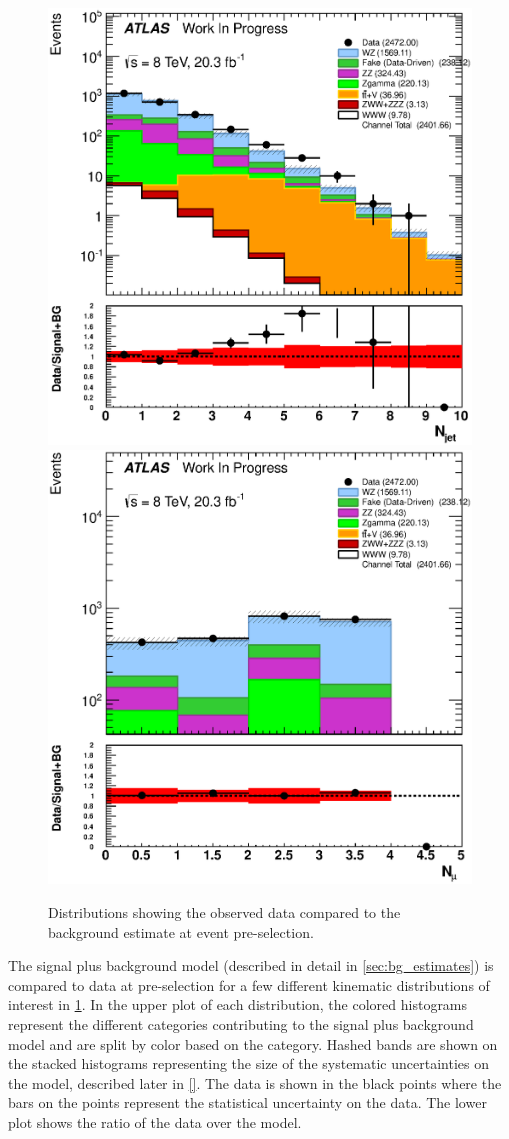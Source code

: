 \begin{figure}[ht!]
\includegraphics[width=0.3\columnwidth]{figures/appendix_signal_selection/Nov24Update_FakeSys_KFacSys_LogY_NoRebin/output/jobs/MxM/DataFull_Rates_May13_FakeRatesExactly2Loose_MuonMxMBJetGt0_ElBJetGt0SubtractPC_MxM/PreselectionNov23_15_physics/weight_all/eps/NJets_histratio.eps}
\includegraphics[width=0.3\columnwidth]{figures/appendix_signal_selection/Nov24Update_FakeSys_KFacSys_LogY_NoRebin/output/jobs/MxM/DataFull_Rates_May13_FakeRatesExactly2Loose_MuonMxMBJetGt0_ElBJetGt0SubtractPC_MxM/PreselectionNov23_15_physics/weight_all/eps/NMuons_histratio.eps}
\caption{Distributions showing the observed data compared to the background estimate at event pre-selection.}
\label{fig:preselection}
\end{figure}
The signal plus background model 
(described in detail in \sec\ref{sec:bg_estimates})
is compared to data at pre-selection
for a few different kinematic distributions of interest 
in \fig\ref{fig:preselection}. In the upper plot of each distribution,
the colored histograms 
represent the different categories contributing to the signal 
plus background model and 
are split by color based on the category. 
Hashed bands are shown on the stacked
histograms representing the size of the systematic uncertainties 
on the model, described later in \sec\ref{}.
The data is shown in the black points where the 
bars on the points represent the statistical uncertainty on the data.
The lower plot shows the ratio of the data over the model.
